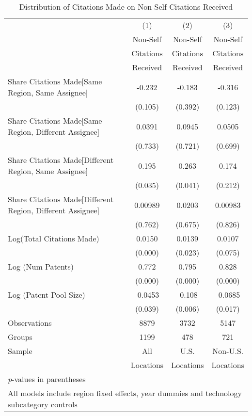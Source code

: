 {
\def\sym#1{\ifmmode^{#1}\else\(^{#1}\)\fi}
\begin{longtable}{l*{3}{c}}
\caption{Distribution of Citations Made on Non-Self Citations Received \label{model192021}}\\
\hline\hline\endfirsthead\hline\endhead\hline\endfoot\endlastfoot
                &\multicolumn{1}{c}{(1)}&\multicolumn{1}{c}{(2)}&\multicolumn{1}{c}{(3)}\\
                &\multicolumn{1}{c}{Non-Self}&\multicolumn{1}{c}{Non-Self}&\multicolumn{1}{c}{Non-Self}\\
                &\multicolumn{1}{c}{Citations}&\multicolumn{1}{c}{Citations}&\multicolumn{1}{c}{Citations}\\
                &\multicolumn{1}{c}{Received}&\multicolumn{1}{c}{Received}&\multicolumn{1}{c}{Received}\\
\hline
Share Citations Made[Same Region, Same Assignee]&   -0.232         &   -0.183         &   -0.316         \\
                &  (0.105)         &  (0.392)         &  (0.123)         \\
Share Citations Made[Same Region, Different Assignee]&   0.0391         &   0.0945         &   0.0505         \\
                &  (0.733)         &  (0.721)         &  (0.699)         \\
Share Citations Made[Different Region, Same Assignee]&    0.195  &    0.263  &    0.174         \\
                &  (0.035)         &  (0.041)         &  (0.212)         \\
Share Citations Made[Different Region, Different Assignee]&  0.00989         &   0.0203         &  0.00983         \\
                &  (0.762)         &  (0.675)         &  (0.826)         \\
Log(Total Citations Made)&   0.0150&   0.0139  &   0.0107         \\
                &  (0.000)         &  (0.023)         &  (0.075)         \\
Log (Num Patents)&    0.772&    0.795&    0.828\\
                &  (0.000)         &  (0.000)         &  (0.000)         \\
Log (Patent Pool Size)&  -0.0453  &   -0.108 &  -0.0685  \\
                &  (0.039)         &  (0.006)         &  (0.017)         \\
\hline
Observations    &     8879         &     3732         &     5147         \\
Groups          &     1199         &      478         &      721         \\
Sample&All &U.S. &Non-U.S. \\
          &Locations &Locations&Locations \\
\hline\hline
\multicolumn{4}{l}{\footnotesize \textit{p}-values in parentheses}\\
\multicolumn{4}{l}{\footnotesize All models include region fixed effects, year dummies and technology subcategory controls}\\
\end{longtable}
}
